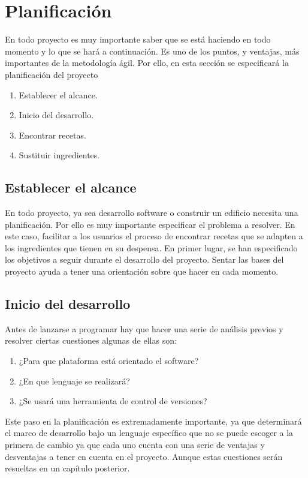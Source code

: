 \section{Planificación}
En todo proyecto es muy importante saber que se está haciendo en todo momento y lo que se hará a continuación. Es uno de los puntos, y ventajas, más importantes de la metodología ágil. Por ello, en esta sección se especificará la planificación del proyecto\:
\begin{enumerate}
    \item Establecer el alcance.
    \item Inicio del desarrollo.
    \item Encontrar recetas.
    \item Sustituir ingredientes.
\end{enumerate}

\subsection{Establecer el alcance}
En todo proyecto, ya sea desarrollo software o construir un edificio necesita una planificación. Por ello es muy importante especificar el problema a resolver. En este caso, facilitar a los usuarios el proceso de encontrar recetas que se adapten a los ingredientes que tienen en su despensa. En primer lugar, se han especificado los objetivos a seguir durante el desarrollo del proyecto. Sentar las bases del proyecto ayuda a tener una orientación sobre que hacer en cada momento. 

\subsection{Inicio del desarrollo}
Antes de lanzarse a programar hay que hacer una serie de análisis previos y resolver ciertas cuestiones algunas de ellas son:
\begin{enumerate}
    \item ¿Para que plataforma está orientado el software?
    \item ¿En que lenguaje se realizará?
    \item ¿Se usará una herramienta de control de versiones?
\end{enumerate}
Este paso en la planificación es extremadamente importante, ya que determinará el marco de desarrollo bajo un lenguaje específico que no se puede escoger a la primera de cambio ya que cada uno cuenta con una serie de ventajas y desventajas a tener en cuenta en el proyecto. Aunque estas cuestiones serán resueltas en un capítulo posterior. 

